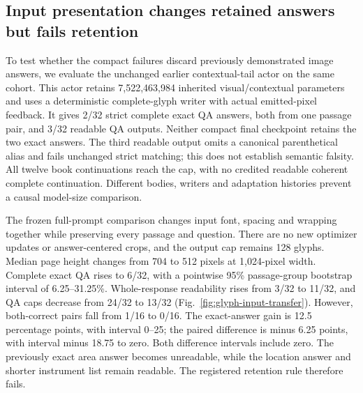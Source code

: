\documentclass[12pt,a4paper]{article}
\providecommand{\DIFadd}[1]{{\protect\color{blue} \sf #1}} %
\providecommand{\DIFaddbegin}{} %
\begin{document}

\DIFaddbegin \subsection*{\DIFadd{Input presentation changes retained answers but fails retention}}
\DIFadd{To test whether the compact failures discard previously demonstrated image
answers, we evaluate the unchanged earlier contextual-tail actor on the same
cohort. This actor retains 7,522,463,984 inherited visual/contextual parameters
and uses a deterministic complete-glyph writer with actual emitted-pixel
feedback. It gives 2/32 strict complete exact QA answers, both from one
passage pair, and 3/32 readable QA outputs. Neither compact final checkpoint
retains the two exact answers. The third readable output omits a canonical
parenthetical alias and fails unchanged strict matching; this does not
establish semantic falsity. All twelve book continuations reach the cap,
with no credited readable coherent complete continuation. Different bodies,
writers and adaptation histories prevent a causal model-size comparison.
}

\DIFadd{The frozen full-prompt comparison changes input font, spacing and wrapping
together while preserving every passage and question. There are no new
optimizer updates or answer-centered crops, and the output cap remains 128
glyphs. Median page height changes from 704 to 512 pixels at 1,024-pixel width.
Complete exact QA rises to 6/32, with a pointwise 95\% passage-group bootstrap
interval of 6.25--31.25\%. Whole-response readability rises from 3/32 to 11/32,
and QA caps decrease from 24/32 to 13/32 (Fig.~\ref{fig:glyph-input-transfer}).
However, both-correct pairs fall from 1/16 to 0/16. The exact-answer gain is
12.5 percentage points, with interval 0--25; the paired difference is minus
6.25 points, with interval minus 18.75 to zero. Both difference intervals
include zero. The previously exact area answer becomes unreadable, while
the location answer and shorter instrument list remain readable. The
registered retention rule therefore fails.
}
\end{document}

